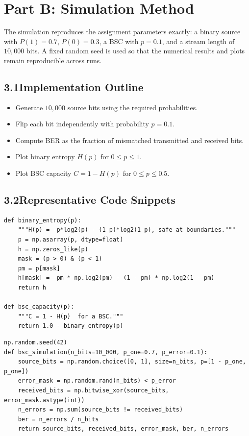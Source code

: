 \documentclass[12pt,a4paper]{article}
\begin{document}
\newpage
\section*{Part B: Simulation Method}
The simulation reproduces the assignment parameters exactly: a binary source with $P(1)=0.7$, $P(0)=0.3$, a BSC with $p=0.1$, and a stream length of $10{,}000$ bits. A fixed random seed is used so that the numerical results and plots remain reproducible across runs.

\subsection*{3.1\hspace{0.4em}Implementation Outline}
\begin{itemize}
    \item Generate $10{,}000$ source bits using the required probabilities.
    \item Flip each bit independently with probability $p=0.1$.
    \item Compute BER as the fraction of mismatched transmitted and received bits.
    \item Plot binary entropy $H(p)$ for $0\leq p\leq 1$.
    \item Plot BSC capacity $C=1-H(p)$ for $0\leq p\leq 0.5$.
\end{itemize}

\subsection*{3.2\hspace{0.4em}Representative Code Snippets}
\begin{lstlisting}[style=py,caption={Binary entropy and channel capacity functions}]
def binary_entropy(p):
    """H(p) = -p*log2(p) - (1-p)*log2(1-p), safe at boundaries."""
    p = np.asarray(p, dtype=float)
    h = np.zeros_like(p)
    mask = (p > 0) & (p < 1)
    pm = p[mask]
    h[mask] = -pm * np.log2(pm) - (1 - pm) * np.log2(1 - pm)
    return h

def bsc_capacity(p):
    """C = 1 - H(p)  for a BSC."""
    return 1.0 - binary_entropy(p)
\end{lstlisting}

\begin{lstlisting}[style=py,caption={Core BSC simulation logic }]
np.random.seed(42)
def bsc_simulation(n_bits=10_000, p_one=0.7, p_error=0.1):
    source_bits = np.random.choice([0, 1], size=n_bits, p=[1 - p_one, p_one])
    error_mask = np.random.rand(n_bits) < p_error
    received_bits = np.bitwise_xor(source_bits, error_mask.astype(int))
    n_errors = np.sum(source_bits != received_bits)
    ber = n_errors / n_bits
    return source_bits, received_bits, error_mask, ber, n_errors
\end{lstlisting}
\end{document}
